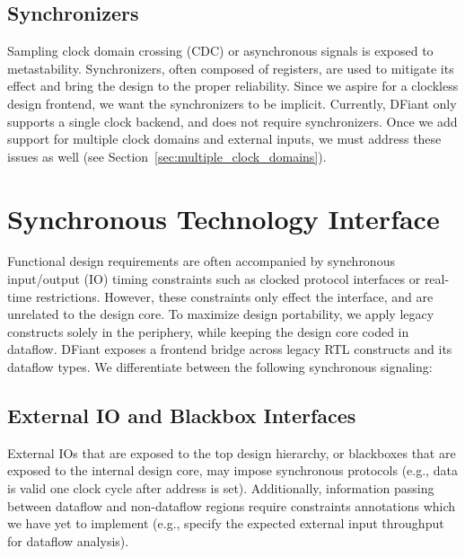 \subsection{Synchronizers}
Sampling clock domain crossing (CDC) or asynchronous signals is exposed to metastability. Synchronizers, often composed of registers, are used to mitigate its effect and bring the design to the proper reliability. Since we aspire for a clockless design frontend, we want the synchronizers to be implicit. Currently, DFiant only supports a single clock backend, and does not require synchronizers. Once we add support for multiple clock domains and external inputs, we must address these issues as well (see Section~\ref{sec:multiple_clock_domains}).

\section{Synchronous Technology Interface}
\label{sec:sync_ifc}
Functional design requirements are often accompanied by synchronous input/output (IO) timing constraints such as clocked protocol interfaces or real-time restrictions. However, these constraints only effect the interface, and are unrelated to the design core. To maximize design portability, we apply legacy constructs solely in the periphery, while keeping the design core coded in dataflow. DFiant exposes a frontend bridge across legacy RTL constructs and its dataflow types. We differentiate between the following synchronous signaling:
\subsection{External IO and Blackbox Interfaces}
External IOs that are exposed to the top design hierarchy, or blackboxes that are exposed to the internal design core, may impose synchronous protocols (e.g., data is valid one clock cycle after address is set). Additionally, information passing between dataflow and non-dataflow regions require constraints annotations which we have yet to implement (e.g., specify the expected external input throughput for dataflow analysis). 
